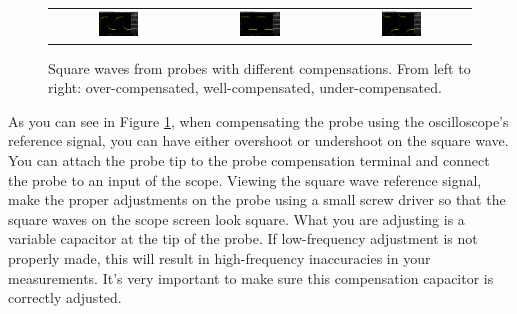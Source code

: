 \documentclass[12pt]{../manual}
\begin{document}
\begin{figure}[ht!]
\begin{center}
\begin{tabular}{ccc}
\includegraphics[width=0.31\textwidth]{figures/overcomp} & \includegraphics[width=0.31\textwidth]{figures/wellcomp} & 
\includegraphics[width=0.31\textwidth]{figures/undercomp}
\end{tabular}
\caption[Square waves from probes with different compensations]{Square waves from probes with different compensations. From left to right: over-compensated, well-compensated, under-compensated.}
\label{fig:oscdifcomp}
\end{center}
\end{figure}


As you can see in Figure \ref{fig:oscdifcomp}, when compensating the probe using the oscilloscope's reference signal, you can have either overshoot or undershoot on the square wave. You can attach the probe tip to the probe compensation terminal and connect the probe to an input of the scope. Viewing the square wave reference signal, make the proper adjustments on the probe using a small screw driver so that the square waves on the scope screen look square. What you are adjusting is a variable capacitor at the tip of the probe. If low-frequency adjustment is not properly made, this will result in high-frequency inaccuracies in your measurements.  It's very important to make sure this compensation capacitor is correctly adjusted.
\end{document}
